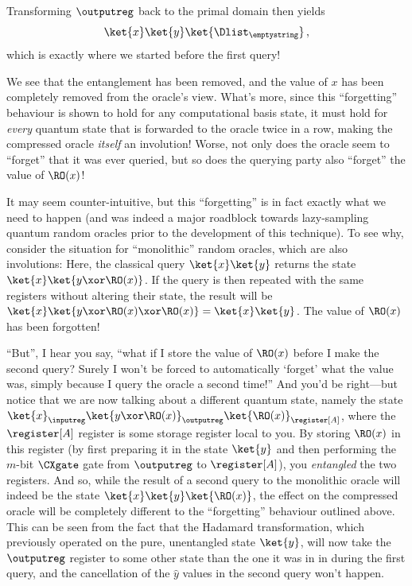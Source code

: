       \noindent
      Transforming $\outputreg$ back to the primal domain then yields
      \[
          \ket{x} \ket{y} \ket{\Dlist_\emptystring}\, ,
      \]
      which is exactly where we started before the first query!

      We see that the entanglement has been removed,
        and the value of $x$ has been completely removed from the oracle's view.
        What's more, since this ``forgetting'' behaviour is shown to hold for
        any computational basis state, it must hold for \emph{every} quantum
        state that is forwarded to the oracle twice in a row, making the
        compressed oracle \emph{itself} an involution!
        Worse, not only does the oracle seem to ``forget'' that it was ever
        queried, but so does the querying party also ``forget'' the value of
        $\RO(x)$!

      It may seem counter-intuitive, but this ``forgetting'' is in fact exactly
        what we need to happen (and was indeed a major roadblock towards
        lazy-sampling quantum random oracles prior to the development of this
        technique). To see why, consider the situation for
        ``monolithic'' random oracles, which are also involutions: 
        Here, the classical query $\ket{x}\ket{y}$ returns the state $\ket{x}\ket{y \xor
        \RO(x)}$. If the query is then repeated with the same registers
        without altering their state, the result will be $\ket{x}\ket{y \xor \RO(x)\xor \RO(x)} =
        \ket{x}\ket{y}$. The value of $\RO(x)$ has been forgotten!

      ``But'', I hear you say, ``what if I store the value of $\RO(x)$ before
        I make the second query? Surely I won't be forced to automatically
        `forget' what the value was, simply because I query the oracle a second
        time!'' And you'd be right---but notice that we are now talking about a
        different quantum state, namely the state
        $\ket{x}_\inputreg \ket{y\xor \RO(x)}_\outputreg
        \ket{\RO(x)}_{\register[A]}$, where the $\register[A]$ register is
        some storage register local to you. By storing $\RO(x)$ in this
        register (by first preparing it in the state $\ket{y}$ and
        then performing the $m$-bit $\CXgate$ gate from $\outputreg$ to
        $\register[A]$), you \emph{entangled} the two registers. And so,
        while the result of a second query to the monolithic oracle will indeed be
        the state $\ket{x}\ket{y}\ket{\RO(x)}$, the effect on
        the compressed oracle will be completely different to the
        ``forgetting'' behaviour outlined above. This can be seen from the fact
        that the Hadamard transformation, which previously operated on the
        pure, unentangled state $\ket{y}$, will now take the $\outputreg$ register
        to some other state than the one it was in in during the first query, and the
        cancellation of the $\hat{y}$ values in the second query won't happen.


